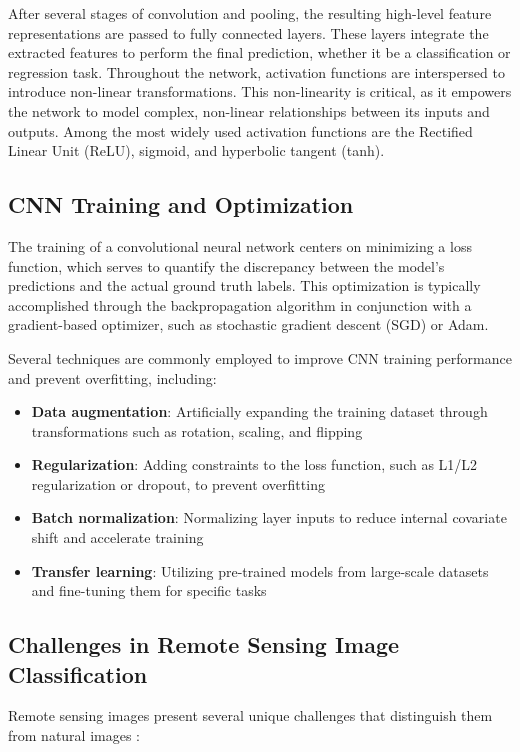 \documentclass[12pt,a4paper]{article}
\begin{document}
After several stages of convolution and pooling, the resulting high-level feature representations are passed to fully connected layers. These layers integrate the extracted features to perform the final prediction, whether it be a classification or regression task. Throughout the network, activation functions are interspersed to introduce non-linear transformations. This non-linearity is critical, as it empowers the network to model complex, non-linear relationships between its inputs and outputs. Among the most widely used activation functions are the Rectified Linear Unit (ReLU), sigmoid, and hyperbolic tangent (tanh).

\subsection{CNN Training and Optimization}
The training of a convolutional neural network centers on minimizing a loss function, which serves to quantify the discrepancy between the model's predictions and the actual ground truth labels. This optimization is typically accomplished through the backpropagation algorithm in conjunction with a gradient-based optimizer, such as stochastic gradient descent (SGD) or Adam.

Several techniques are commonly employed to improve CNN training performance and prevent overfitting, including:
\begin{itemize}
\item \textbf{Data augmentation}: Artificially expanding the training dataset through transformations such as rotation, scaling, and flipping
\item \textbf{Regularization}: Adding constraints to the loss function, such as L1/L2 regularization or dropout, to prevent overfitting
\item \textbf{Batch normalization}: Normalizing layer inputs to reduce internal covariate shift and accelerate training
\item \textbf{Transfer learning}: Utilizing pre-trained models from large-scale datasets and fine-tuning them for specific tasks
\end{itemize}

\subsection{Challenges in Remote Sensing Image Classification}
Remote sensing images present several unique challenges that distinguish them from natural images \cite{zhu2017deep}:
\end{document}
